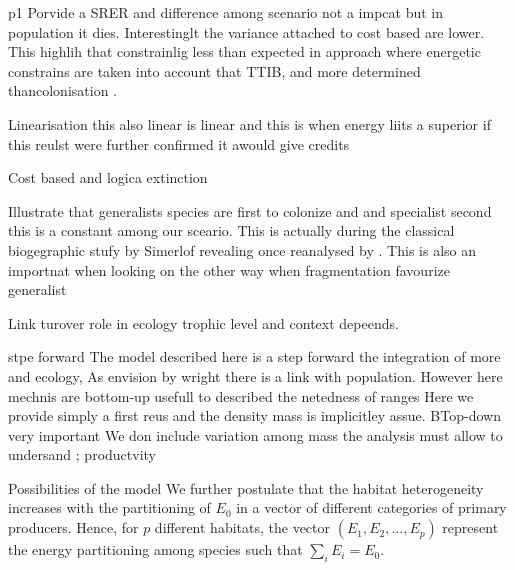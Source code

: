 p1 Porvide a SRER and difference among scenario not a impcat but in
population it dies. Interestinglt the variance attached to cost based
are lower. This highlih that constrainlig less than expected in approach
where energetic constrains are taken into account that TTIB, and more
determined thancolonisation \citep{Cirtwill2015}.

Linearisation this also linear \citep{Wright1983} is linear and this is
when energy liits a superior if this reulst were further confirmed it
awould give credits

Cost based and logica extinction

Illustrate that generalists species are first to colonize and and
specialist second this is a constant among our sceario. This is actually
during the classical biogegraphic stufy by Simerlof revealing once
reanalysed by \citep{Piechnik2008}. This is also an importnat when
looking on the other way when fragmentation favourize generalist
\citep{Simberloff1969b}

Link turover role in ecology trophic level and context depeends.

stpe forward The model described here is a step forward the integration
of more and ecology, As envision by wright there is a link with
population. However here mechnis are bottom-up usefull to described the
netedness of ranges \citep{Cirtwill2015} Here we provide simply a first
reus and the density mass is implicitley assue. BTop-down very important
We don include variation among mass\citep{Terborgh1971} the analysis
must allow to undersand \citep{Hatton2015}; productvity

Possibilities of the model We further postulate that the habitat
heterogeneity increases with the partitioning of \(E_0\) in a vector of
different categories of primary producers. Hence, for \(p\) different
habitats, the vector \((E_1, E_2, ..., E_p)\) represent the energy
partitioning among species such that \(\sum_i E_i=E_0\).

